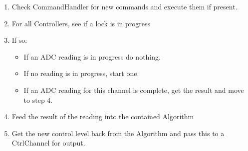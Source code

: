 \documentclass[11pt]{report}
\begin{document}
\begin{enumerate}
	
	\item Check CommandHandler for new commands and execute them if present. 
	\item For all Controllers, see if a lock is in progress
	\item If so:
	\begin{itemize}
	 	\item If an ADC reading is in progress do nothing. 
	 	\item If no reading is in progress, start one. 
	 	\item If an ADC reading for this channel is complete, get the result and move to step 4. 
	 \end{itemize} 
	\item Feed the result of the reading into the contained Algorithm
	\item Get the new control level back from the Algorithm and pass this to a CtrlChannel for output. 

\end{enumerate}

\end{document}
